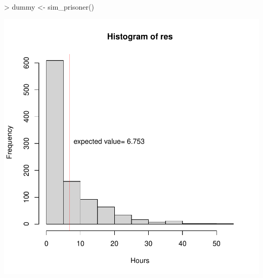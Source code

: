 \begin{Schunk}
\begin{Sinput}
> dummy <- sim_prisoner() 
\end{Sinput}
\end{Schunk}
\includegraphics{sim_prisoner_problem-003}


